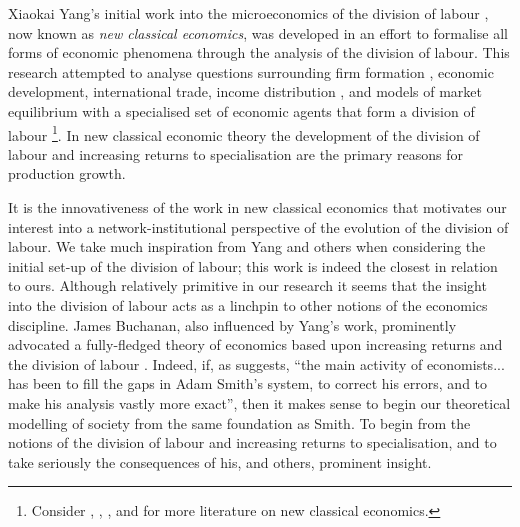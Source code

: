 Xiaokai Yang's initial work into the microeconomics of the division of labour \citep{Yang1988}, now known as \emph{new classical economics}, was developed in an effort to formalise all forms of economic phenomena through the analysis of the division of labour. This research attempted to analyse questions surrounding firm formation \citep{YangNg1995, Yang2000}, economic development, international trade, income distribution \citep{YangZhang2003}, and models of market equilibrium with a specialised set of economic agents that form a division of labour \citep{Yao2002, SunYangZhou2004, YangYao2005} \footnote{Consider \citet{YangNg1993}, \citet{YangChengShi2005}, \citet{TombazosYang2006}, and \citet{YangLiu2008} for more literature on new classical economics.}. In new classical economic theory the development of the division of labour and increasing returns to specialisation are the primary reasons for production growth. 


It is the innovativeness of the work in new classical economics that motivates our interest into a network-institutional perspective of the evolution of the division of labour. We take much inspiration from Yang and others when considering the initial set-up of the division of labour; this work is indeed the closest in relation to ours. Although relatively primitive in our research it seems that the insight into the division of labour acts as a linchpin to other notions of the economics discipline. James Buchanan, also influenced by Yang's work, prominently advocated a fully-fledged theory of economics based upon increasing returns and the division of labour \citep{BuchananYoon1994}. Indeed, if, as \citet[p.~713]{Coase1992} suggests, ``the main activity of economists... has been to fill the gaps in Adam Smith's system, to correct his errors, and to make his analysis vastly more exact'', then it makes sense to begin our theoretical modelling of society from the same foundation as Smith. To begin from the notions of the division of labour and increasing returns to specialisation, and to take seriously the consequences of his, and others, prominent insight.

